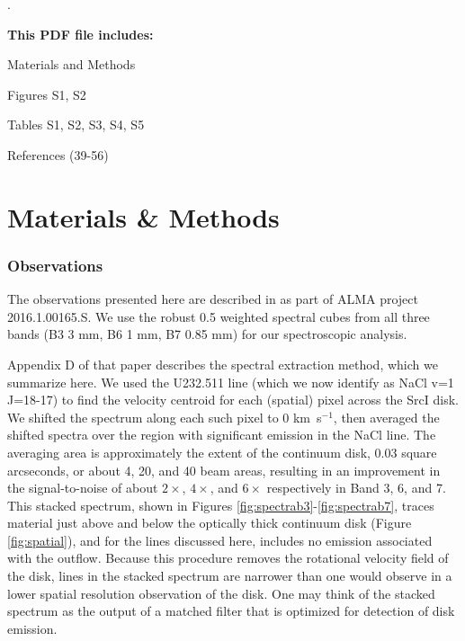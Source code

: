 \documentclass[12pt]{article}
\newcounter{lastnote}
\newenvironment{scilastnote}{%
\setcounter{lastnote}{\value{enumiv}}%
\addtocounter{lastnote}{+1}%
\begin{list}%
{\arabic{lastnote}.}
{\setlength{\leftmargin}{.22in}}
{\setlength{\labelsep}{.5em}}}
{\end{list}}
\newcommand{\sourcei}{SrcI\xspace}
\newcommand{\kms}{\textrm{km~s}\ensuremath{^{-1}}\xspace}	%
\begin{document}
\begin{scilastnote}
\item[] \textbf{This PDF file includes:}


Materials and Methods

Figures S1, S2

Tables S1, S2, S3, S4, S5

References (39-56)

 \end{scilastnote}
 
 \clearpage
 
 \part*{Materials \& Methods}

\renewcommand{\thefigure}{S\arabic{figure}}
\renewcommand{\thetable}{S\arabic{table}}
\renewcommand{\theequation}{S\arabic{equation}}
\setcounter{figure}{0}
\setcounter{table}{0}
\setcounter{equation}{0}


\section*{Observations}

The observations presented here are described in \cite{Ginsburg2018b} as part
of ALMA project 2016.1.00165.S.  We use the robust 0.5 weighted spectral cubes
from all three bands (B3 3 mm, B6 1 mm, B7 0.85 mm) for our spectroscopic analysis.

Appendix D of that paper describes the spectral extraction method,
which we summarize here.  We used the U232.511 line (which we now identify as
NaCl v=1 J=18-17) to find the velocity centroid for each (spatial) pixel
across the \sourcei disk.  We shifted the spectrum along
each such pixel to 0 \kms, then averaged the shifted spectra over the region with
significant emission in the NaCl line.  
The
averaging area is approximately the extent of the continuum disk, 0.03 square
arcseconds, or about 4, 20, and 40  beam areas, resulting
in an improvement in the signal-to-noise of about $2\times$, $4\times$, and $6\times$
respectively in Band 3, 6, and 7.
This stacked spectrum, shown in Figures \ref{fig:spectrab3}-\ref{fig:spectrab7},
traces material just above and below the optically thick continuum disk
(Figure \ref{fig:spatial}), and for the lines discussed here, includes no
emission associated with the outflow.  
Because this procedure removes the rotational velocity field of the disk,
lines in the stacked spectrum are narrower than one would observe in
a lower spatial resolution observation of the disk.  One may think of the
stacked spectrum as the output of a matched filter that is optimized for
detection of disk emission.
\end{document}
